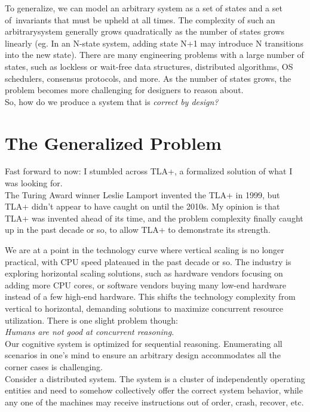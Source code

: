 To generalize, we can model an arbitrary system as a set of states and a set of invariants that must be upheld at all times. The complexity of such an arbitrarysystem generally grows quadratically as the number of states grows linearly (eg.
In an N-state system, adding state N+1 may introduce N transitions into the new
state). There are many engineering problems with a large number of states, such
as lockless or wait-free data structures, distributed algorithms, OS schedulers,
consensus protocols, and more. As the number of states grows, the problem becomes
more challenging for designers to reason about.\\

So, how do we produce a system that is \textit{correct by design?} 

\section{The Generalized Problem}

Fast forward to now: I stumbled across TLA+, a formalized solution of what I
was looking for.\\

The Turing Award winner Leslie Lamport invented the TLA+ in 1999, but TLA+
didn't appear to have caught on until the 2010s. My opinion is that TLA+ was
invented ahead of its time, and the problem complexity finally caught up in the
past decade or so, to allow TLA+ to demonstrate its strength.\newline

We are at a point in the technology curve where vertical scaling is no
longer practical, with CPU speed plateaued in the past decade or so. The industry
is exploring horizontal scaling solutions, such as hardware vendors focusing on
adding more CPU cores, or software vendors buying many low-end hardware instead
of a few high-end hardware. This shifts the technology complexity from vertical
to horizontal, demanding solutions to maximize concurrent resource
utilization. There is one slight problem though:\\

\textit{Humans are not good at concurrent reasoning}.\\

Our cognitive system is optimized for sequential reasoning. Enumerating
all scenarios in one's mind to ensure an arbitrary design accommodates all
the corner cases is challenging.\\

Consider a distributed system. The system is a cluster of independently operating
entities and need to somehow collectively offer the correct system behavior,
while any one of the machines may receive instructions out of order, crash,
recover, etc.\\

